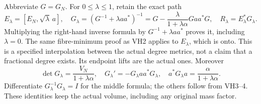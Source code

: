 \documentclass[11pt]{article}
\begin{document}
Abbreviate \(G=G_N\). For \(0\le\lambda\le1\), retain the exact path
\begin{equation}\tag{VH4}\label{hvh:VH4}
E_\lambda=[E_N,\sqrt\lambda\,a],\quad
G_\lambda=(G^{-1}+\lambda aa^*)^{-1}
=G-\frac{\lambda}{1+\lambda\alpha}Gaa^*G,\quad
R_\lambda=E_\lambda^*G_\lambda.
\end{equation}
Multiplying the right-hand inverse formula by \(G^{-1}+\lambda aa^*\)
proves it, including \(\lambda=0\). The same fibre-minimum proof as
VH2 applies to \(E_\lambda\), which is onto. This is a specified
interpolation between the actual degree metrics, not a claim that a
fractional degree exists. Its endpoint lifts are the actual ones.
Moreover
\begin{equation}\tag{VH5}\label{hvh:VH5}
\det G_\lambda=\frac{V_N}{1+\lambda\alpha},\quad
G_\lambda'=-G_\lambda aa^*G_\lambda,\quad
a^*G_\lambda a=\frac{\alpha}{1+\lambda\alpha}.
\end{equation}
Differentiate \(G_\lambda^{-1}G_\lambda=I\) for the middle formula;
the others follow from VH3--4. These identities keep the actual
volume, including any original mass factor.
\end{document}
